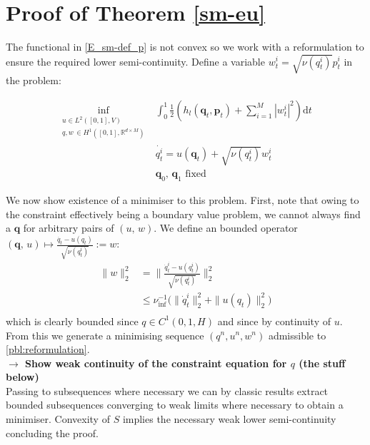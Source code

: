 \documentclass[runningheads]{llncs}
\newcommand{\half}{\frac 12}
\newcommand{\norm}[2]{\| #1 \|_{ #2 }}
\newcommand{\ltwonorm}[1]{\norm{ #1 }{2}}
\newcommand{\diff}[1]{\text{d} #1}
\newcommand{\RdM}{\mathbb{R}^{d\times M}}
\newcommand{\nuinf}{\nu_\text{inf}}
\begin{document}
\section{Proof of Theorem \ref{sm-eu}}\label{app:proof:sm-eu}
The functional in \eqref{E_sm-def_p} is not convex so we work with a
reformulation to ensure the required lower semi-continuity. Define a
variable $w^i_t = \sqrt{\nu(q_t^i)} p^i_t$ in the problem:

\begin{align}
\inf_{\substack{u \in L^2([0,1],V)\\ q, w\, \in H^1([0,1],\RdM)}}
    & \int_0^1\half\left (h_l(\mathbf q_t,\mathbf p_t)  +\sum_{i=1}^M |w_t^i|^2\right )\diff{t}\\
    & \dot{q_t^i} = u(\mathbf q_t) + \sqrt{\nu(q_t^i)} w^i_t\\
    & \mathbf q_0,\,\mathbf q_1\text{ fixed}
  \label{pbl:reformulation}
\end{align}

We now show existence of a minimiser to this problem. First, note that owing to
the constraint effectively being a boundary value problem, we cannot always find
a $\mathbf q$ for arbitrary pairs of $(u,\,w)$. We define an bounded operator
$(\mathbf q,\, u)\mapsto \frac{\dot{q_t} - u(q_t)}{\sqrt{\nu(q_t^i)}} := w$:
\begin{align*}
\ltwonorm{w}^2 & = \ltwonorm{\frac{\dot{q}_t^i - u(q_t^i)}{\sqrt{\nu(q_t^i)}}}^2\\
& \leq \nuinf^{-1}\Big(\ltwonorm{\dot{q}_t^i}^2 + \ltwonorm{u(q_t)}^2\Big)\\
\end{align*}
which is clearly bounded since $q\in C^1(0,1,H)$ and since by continuity of $u$.
From this we generate a minimising sequence $(q^n, u^n, w^n)$ admissible to
\eqref{pbl:reformulation}.\\

\textbf{$\longrightarrow$ Show weak continuity of the constraint equation for
$q$ (the stuff below)}\\

Passing to subsequences where necessary we can by classic results
\cite{younes2010shapes} extract bounded subsequences converging to weak limits
where necessary to obtain a minimiser. Convexity of $S$ implies the necessary
weak lower semi-continuity concluding the proof.

\end{document}
